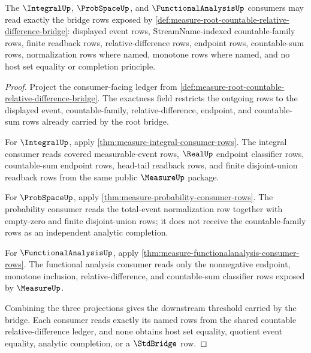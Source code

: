 \begin{theorem}
\label{thm:measure-root-countable-relative-difference-consumer-unblock}
The $\IntegralUp$, $\ProbSpaceUp$, and $\FunctionalAnalysisUp$ consumers may
read exactly the bridge rows exposed by
\autoref{def:measure-root-countable-relative-difference-bridge}: displayed
event rows, StreamName-indexed countable-family rows, finite readback rows,
relative-difference rows, endpoint rows, countable-sum rows, normalization
rows where named, monotone rows where named, and no host set equality or
completion principle.
\end{theorem}
\begin{proof}
Project the consumer-facing ledger from
\autoref{def:measure-root-countable-relative-difference-bridge}. The exactness
field restricts the outgoing rows to the displayed event, countable-family,
relative-difference, endpoint, and countable-sum rows already carried by the
root bridge.

For $\IntegralUp$, apply \autoref{thm:measure-integral-consumer-rows}. The
integral consumer reads covered measurable-event rows, $\RealUp$ endpoint
classifier rows, countable-sum endpoint rows, head-tail readback rows, and
finite disjoint-union readback rows from the same public $\MeasureUp$ package.

For $\ProbSpaceUp$, apply \autoref{thm:measure-probability-consumer-rows}.
The probability consumer reads the total-event normalization row together
with empty-zero and finite disjoint-union rows; it does not receive the
countable-family rows as an independent analytic completion.

For $\FunctionalAnalysisUp$, apply
\autoref{thm:measure-functionalanalysis-consumer-rows}. The functional
analysis consumer reads only the nonnegative endpoint, monotone inclusion,
relative-difference, and countable-sum classifier rows exposed by
$\MeasureUp$.

Combining the three projections gives the downstream threshold carried by
the bridge. Each consumer reads exactly its named rows from the shared
countable relative-difference ledger, and none obtains host set equality,
quotient event equality, analytic completion, or a $\StdBridge$ row.
\end{proof}
